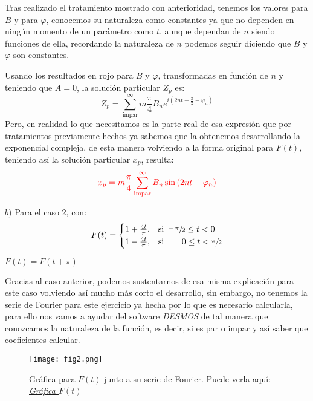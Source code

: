 \begin{multicols}{2}

Tras realizado el tratamiento mostrado con anterioridad, tenemos los valores para $B$ y para $\varphi$, conocemos su naturaleza como constantes ya que no dependen en ningún momento de un parámetro como $t$, aunque dependan de $n$ siendo funciones de ella, recordando la naturaleza de $n$ podemos seguir diciendo que $B$ y $\varphi$ son constantes.

Usando los resultados en rojo para $B$ y $\varphi$, transformadas en función de $n$ y teniendo que $A = 0$, la solución particular $Z_p$ es:
\begin{equation*}
    Z_p = \sum_{\mathrm{impar}}^{\infty} m\frac{\pi}{4} B_n e^{i\left(2nt - \frac{\pi}{2} - \varphi_n\right)}
\end{equation*}
Pero, en realidad lo que necesitamos es la parte real de esa expresión que por tratamientos previamente hechos ya sabemos que la obtenemos desarrollando la exponencial compleja, de esta manera volviendo a la forma original para $F(t)$, teniendo así la solución particular $x_p$, resulta:
\begin{equation}
    \textcolor{rojo}{x_p = m\frac{\pi}{4} \sum_{\mathrm{impar}}^{\infty} B_n \sin\left(2nt - \varphi_n\right)} \label{pro5:res4}
\end{equation}

$b)$ Para el caso 2, con:
\begin{equation*}
    F(t) =
    \begin{cases}
    1 + \frac{4t}{\pi},&\text{si } \sfrac{-\pi}{2} \leq t < 0\\
    1 - \frac{4t}{\pi},&\text{si } \hspace{18pt} 0 \leq t < \sfrac{\pi}{2}
    \end{cases}
\end{equation*}
\begin{center}$F(t)=F(t+\pi)$\end{center}

Gracias al caso anterior, podemos sustentarnos de esa misma explicación para este caso volviendo así mucho más corto el desarrollo, sin embargo, no tenemos la serie de Fourier para este ejercicio ya hecha por lo que es necesario calcularla, para ello nos vamos a ayudar del software \textit{DESMOS} de tal manera que conozcamos la naturaleza de la función, es decir, si es par o impar y así saber que coeficientes calcular.

\begin{figure}[H]
\begin{center}
\texttt{[image: fig2.png]}
\caption{Gráfica para $F(t)$ junto a su serie de Fourier. Puede verla aquí: \href{https://www.desmos.com/calculator/y9swhr0e0u}{\textit{Gráfica $F(t)$}}}
\label{fig2}
\end{center}
\end{figure}


\end{multicols}

